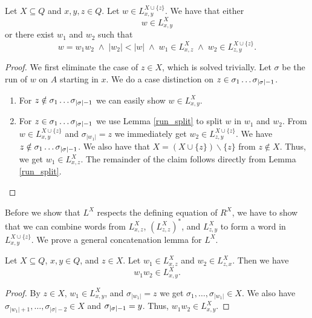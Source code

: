 \begin{lemma}
    \label{L_split}
    Let $X \subseteq Q$ and $x,y,z \in Q$.
    Let $w \in L^{X\cup\{z\}}_{x,y}$.
    We have that either    
    \begin{equation*}
        w \in L^{X}_{x,y} 
    \end{equation*}
    or there exist $w_1$ and $w_2$ such that
    \begin{equation*}
        w = w_1 w_2 \; \wedge \; |w_2| < |w| \;
        \wedge \; w_1 \in L^X_{x,z} \; \wedge \; w_2 \in L^{X \cup \{z\}}_{z,y}.
    \end{equation*}
\end{lemma}
\begin{proof}
    We first eliminate the case of $z \in X$, which is solved trivially.
    Let $\sigma$ be the run of $w$ on $A$ starting in $x$.
    We do a case distinction on $z \in \sigma_1 \ldots {\sigma}_{|{\sigma}|-1}$.
    \begin{enumerate}
        \item For $z \notin \sigma_1 \ldots {\sigma}_{|{\sigma}|-1}$ we can easily show $w \in L^X_{x,y}$.
        \item 
            For $z \in \sigma_1 \ldots {\sigma}_{|{\sigma}|-1}$ we use Lemma \ref{run_split} to split $w$ in $w_1$ and $w_2$.
            From $w \in L^{X\cup\{z\}}_{x,y}$ and $\sigma_{|w_1|} = z$ we immediately get $w_2 \in L^{X\cup\{z\}}_{z,y}$.
            We have $z \notin \sigma_1 \ldots {\sigma}_{|{\sigma}|-1}$.
            We also have that $X = (X \cup \{z\})\backslash\{z\}$ from $z \notin X$.
            Thus, we get $w_1 \in L^{X}_{x,z}$. The remainder of the claim follows directly from Lemma \ref{run_split}.
    \end{enumerate}
\end{proof}

Before we show that $L^X$ respects the defining equation of $R^X$, 
we have to show that we can combine words from $L^{X}_{x,z}$, $(L^{X}_{z,z})^*$, and $L^{X}_{z,y}$ to form a word in $L^{X\cup\{z\}}_{x,y}$.
We prove a general concatenation lemma for $L^X$.

\begin{lemma}
    \label{L_cat}
    Let $X \subseteq Q$, $x,y\in Q$, and $z \in X$. 
    Let $w_1 \in L^X_{x,z}$ and $w_2 \in L^X_{z,x}$.
    Then we have
    \begin{equation*}
        w_1 w_2 \in L^X_{x,y}.
    \end{equation*}
\end{lemma}
\begin{proof}
    By $z \in X$, $w_1 \in L^X_{x,y}$, and $\sigma_{|w_1|} = z$ we get $\sigma_1, \ldots, \sigma_{|w_1|} \in X$.
    We also have $\sigma_{|w_1|+1}, \ldots, \sigma_{|\sigma|-2} \in X$ and ${\sigma}_{|{\sigma}|-1} = y$. Thus, $w_1 w_2 \in L^X_{x,y}$.
\end{proof}

